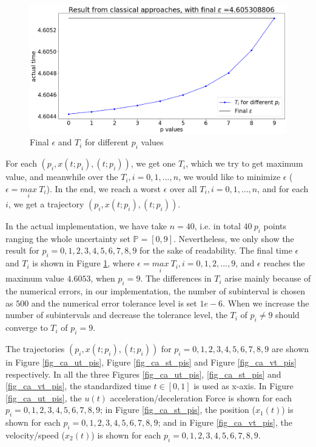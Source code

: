 \documentclass  [
  paper    = a4,
  BCOR     = 10mm,
  twoside,
  fontsize = 12pt,
  fleqn,
  toc      = bibnumbered,
  toc      = listofnumbered,
  numbers  = noendperiod,
  headings = normal,
  listof   = leveldown,
  version  = 3.03
]                                       {scrreprt}
\newcommand{\<}{\langle}
\renewcommand{\>}{\rangle}
\begin{document}
\begin{figure}[H]
	\centerline{\includegraphics[width=12cm]{ca_result.png}}
	\caption{Final $\epsilon$ and $T_i$ for different $p_i$ values}
	\label{fig_ca_result}
\end{figure}

For each $(p_i, x(t;p_i), (t;p_i))$, we get one $T_i$, which we try to get maximum value, and meanwhile over the $T_i, i =0, 1, ..., n$, we would like to minimize $\epsilon$ ($\epsilon = \underset{i}{max} \ T_i$). In the end, we reach a worst $\epsilon$ over all $T_i, i =0, 1, ..., n$, and for each $i$, we get a trajectory $(p_i, x(t;p_i), (t;p_i))$. 

In the actual implementation, we have take $n=40$, i.e. in total $40 \ p_i$ points ranging the whole uncertainty set $\mathbb{P}=[0,9]$. Nevertheless, we only show the result for $p_i=0, 1, 2, 3, 4, 5, 6, 7, 8, 9$ for the sake of readability. The final time $\epsilon$ and $T_i$  is shown in Figure \ref{fig_ca_result}, where $\epsilon = \underset{i}{max} \ T_i, i = 0, 1, 2, ..., 9$, and $\epsilon$ reaches the maximum value $4.6053$, when $p_i=9$. The differences in $T_i$ arise mainly because of the numerical errors, in our implementation, the number of subinterval is chosen as $500$ and the numerical error tolerance level is set $1e-6$. When we increase the number of subintervals and decrease the tolerance level, the $T_i$ of $p_i\neq 9$ should converge to $T_i$ of $p_i=9$. 


The trajectories $(p_i, x(t;p_i), (t;p_i))$ for $p_i=0, 1, 2, 3, 4, 5, 6, 7, 8, 9$ are shown in Figure \ref{fig_ca_ut_pis}, Figure \ref{fig_ca_st_pis} and Figure \ref{fig_ca_vt_pis} respectively. In all the three Figures \ref{fig_ca_ut_pis}, \ref{fig_ca_st_pis} and \ref{fig_ca_vt_pis}, the standardized time $t \in [0,1]$ is used as x-axis. In Figure \ref{fig_ca_ut_pis}, the $u(t)$ acceleration/deceleration Force is shown for each $p_i=0, 1, 2, 3, 4, 5, 6, 7, 8, 9$; in Figure \ref{fig_ca_st_pis}, the position ($x_1(t)$) is shown for each $p_i=0, 1, 2, 3, 4, 5, 6, 7, 8, 9$; and in Figure \ref{fig_ca_vt_pis}, the velocity/speed ($x_2(t)$) is shown for each $p_i=0, 1, 2, 3, 4, 5, 6, 7, 8, 9$. 
\end{document}
